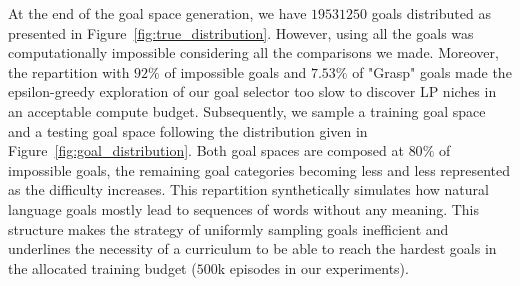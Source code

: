 At the end of the goal space generation, we have $19 531 250$ goals distributed as presented in Figure~\ref{fig:true_distribution}. However, using all the goals was computationally impossible considering all the comparisons we made. Moreover, the repartition with $92\%$ of impossible goals and $7.53\%$ of "Grasp" goals made the epsilon-greedy exploration of our goal selector too slow to discover LP niches in an acceptable compute budget. Subsequently, we sample a training goal space and a testing goal space following the distribution given in Figure~\ref{fig:goal_distribution}. Both goal spaces are composed at $80\%$ of impossible goals, the remaining goal categories becoming less and less represented as the difficulty increases. This repartition synthetically simulates how natural language goals mostly lead to sequences of words without any meaning. This structure makes the strategy of uniformly sampling goals inefficient and underlines the necessity of a curriculum to be able to reach the hardest goals in the allocated training budget ($500$k episodes in our experiments).



